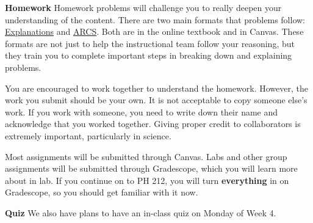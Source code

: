 \documentclass[]{article}
\begin{document}
\begin{TeacherMargin}
\noindent\textbf{Homework} Homework problems will challenge you to really deepen your understanding of the content. There are two main formats that problems follow: \href{https://lipa.physics.oregonstate.edu/sec_what-is-motion.html}{\color{blue}Explanations} and \href{https://lipa.physics.oregonstate.edu/sec_real-world-context.html}{\color{blue}ARCS}. Both are in the online textbook and in Canvas. These formats are not just to help the instructional team follow your reasoning, but they train you to complete important steps in breaking down and explaining problems.

You are encouraged to work together to understand the homework. However, the work you submit should be your own. It is not acceptable to copy someone else's work. If you work with someone, you need to write down their name and acknowledge that you worked together. Giving proper credit to collaborators is extremely important, particularly in science.

Most assignments will be submitted through Canvas. Labs and other group assignments will be submitted through Gradescope, which you will learn more about in lab. If you continue on to PH 212, you will turn \textbf{everything} in on Gradescope, so you should get familiar with it now.

\noindent\textbf{Quiz} We also have plans to have an in-class quiz on Monday of Week 4.
\end{TeacherMargin}
\end{document}
